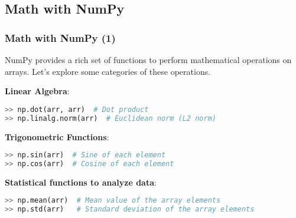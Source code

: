 \subsection*{Math with NumPy}
\begin{frame}[fragile]
  \frametitle{Math with NumPy (1)}
  NumPy provides a rich set of functions to perform mathematical operations on arrays. Let's explore some categories of these operations.\pause

  \textbf{Linear Algebra}:
  \begin{lstlisting}[language=Python, numbers=none]
>> np.dot(arr, arr)  # Dot product
>> np.linalg.norm(arr)  # Euclidean norm (L2 norm)
  \end{lstlisting}\pause

  \textbf{Trigonometric Functions}:
  \begin{lstlisting}[language=Python, numbers=none]
>> np.sin(arr)  # Sine of each element
>> np.cos(arr)  # Cosine of each element
  \end{lstlisting}

  \textbf{Statistical functions to analyze data}:
  \begin{lstlisting}[language=Python, numbers=none]
>> np.mean(arr)  # Mean value of the array elements
>> np.std(arr)   # Standard deviation of the array elements
  \end{lstlisting}\pause
\end{frame}

